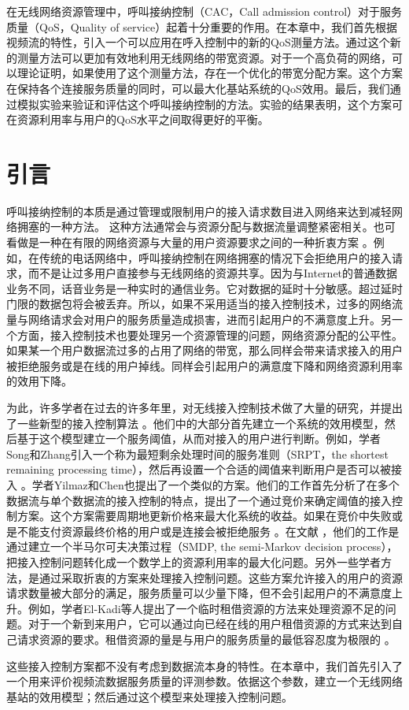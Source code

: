\iffalse
在无线网络资源管理中，呼叫接纳控制（CAC，Call admission control）对于服务质量（QoS，Quality of service）起着十分重要的作用。在本章中，我们首先根据视频流的特性，引入一个可以应用在呼入控制中的新的QoS测量方法。通过这个新的测量方法可以更加有效地利用无线网络的带宽资源。对于一个高负荷的网络，可以理论证明，如果使用了这个测量方法，存在一个优化的带宽分配方案。这个方案在保持各个连接服务质量的同时，可以最大化基站系统的QoS效用。最后，我们通过模拟实验来验证和评估这个呼叫接纳控制的方法。实验的结果表明，这个方案可在资源利用率与用户的QoS水平之间取得更好的平衡。

\section{引言}
\label{section_cacop_introduction}
\par 呼叫接纳控制的本质是通过管理或限制用户的接入请求数目进入网络来达到减轻网络拥塞的一种方法。
这种方法通常会与资源分配与数据流量调整紧密相关。也可看做是一种在有限的网络资源与大量的用户资源要求之间的一种折衷方案\cite{Y-G-Fang.TVT.2002} \cite{Y-Xiao.IEICE.TC.2001}。例如，在传统的电话网络中，呼叫接纳控制在网络拥塞的情况下会拒绝用户的接入请求，而不是让过多用户直接参与无线网络的资源共享。因为与Internet的普通数据业务不同，话音业务是一种实时的通信业务。它对数据的延时十分敏感。超过延时门限的数据包将会被丢弃。所以，如果不采用适当的接入控制技术，过多的网络流量与网络请求会对用户的服务质量造成损害，进而引起用户的不满意度上升。另一个方面，接入控制技术也要处理另一个资源管理的问题，网络资源分配的公平性。如果某一个用户数据流过多的占用了网络的带宽，那么同样会带来请求接入的用户被拒绝服务或是在线的用户掉线。同样会引起用户的满意度下降和网络资源利用率的效用下降。
\par 为此，许多学者在过去的许多年里，对无线接入控制技术做了大量的研究，并提出了一些新型的接入控制算法\cite{Y-Qian.TWC.2006} \cite{G-Djuka.TELSIK.2007}。他们中的大部分首先建立一个系统的效用模型，然后基于这个模型建立一个服务阈值，从而对接入的用户进行判断。例如，学者Song和Zhang引入一个称为最短剩余处理时间的服务准则（SRPT，the shortest remaining processing time），然后再设置一个合适的阈值来判断用户是否可以被接入 \cite{Song2009}。学者Yilmaz和Chen也提出了一个类似的方案。他们的工作首先分析了在多个数据流与单个数据流的接入控制的特点，提出了一个通过竞价来确定阈值的接入控制方案。这个方案需要周期地更新价格来最大化系统的收益。如果在竞价中失败或是不能支付资源最终价格的用户或是连接会被拒绝服务 \cite{Yilmax2009}。在文献 \cite{Zhai2005,Ni2009}，他们的工作是通过建立一个半马尔可夫决策过程（SMDP, the semi-Markov decision process），把接入控制问题转化成一个数学上的资源利用率的最大化问题。另外一些学者方法，是通过采取折衷的方案来处理接入控制问题。这些方案允许接入的用户的资源请求数量被大部分的满足，服务质量可以少量下降，但不会引起用户的不满意度上升。例如，学者El-Kadi等人提出了一个临时租借资源的方法来处理资源不足的问题。对于一个新到来用户，它可以通过向已经在线的用户租借资源的方式来达到自己请求资源的要求。租借资源的量是与用户的服务质量的最低容忍度为极限的 \cite{EL-Kadi2002}。
\par 这些接入控制方案都不没有考虑到数据流本身的特性。在本章中，我们首先引入了一个用来评价视频流数据服务质量的评测参数。依据这个参数，建立一个无线网络基站的效用模型；然后通过这个模型来处理接入控制问题。

